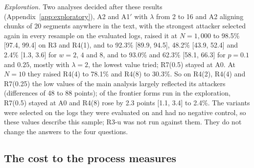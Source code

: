 \emph{Exploration.} Two analyses decided after these results (Appendix~\ref{app:exploratory}), A2 and A1$'$ with
$\lambda$ from 2 to 16 and A2 aligning chunks of 20 segments anywhere in the text, with the strongest attacker
selected again in every resample on the evaluated logs, raised it at $N = 1{,}000$ to 98.5\% [97.4, 99.4] on R3 and R4(1), and to 92.3\% [89.9, 94.5], 48.2\%
[43.9, 52.4] and 2.4\% [1.3, 3.6] for $w = 2$, $4$ and $8$, and to 93.0\% and 62.3\% [58.1, 66.3] for $p = 0.1$
and $0.25$, mostly with $\lambda = 2$, the lowest value tried; R7(0.5) stayed at A0. At $N = 10$ they raised R4(4) to
78.1\% and R4(8) to 30.3\%. So on R4(2), R4(4) and R7(0.25) the low values of the main analysis largely reflected its
attackers (differences of 48 to 88 points); of the frontier forms run in the exploration, R7(0.5) stayed at A0 and
R4(8) rose by 2.3 points [1.1, 3.4] to 2.4\%. The variants were selected on the logs they were evaluated on and had no negative control, so
these values describe this sample; R3-u was not run against them. They do not change the answers to the four
questions.

\subsection{The cost to the process measures}
\label{sec:results:utility}


